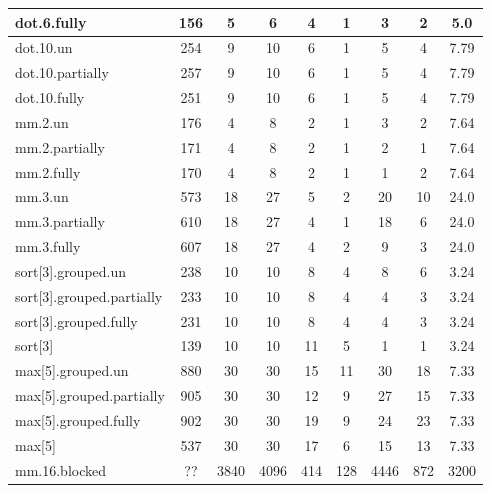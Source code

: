 \begin{table}
\begin{tabular}{lcccccccc}
    dot.6.fully & 156 & 5 & 6 & 4 & 1 & 3 & 2 & 5.0\\
    \midrule
    dot.10.un & 254 & 9 & 10 & 6 & 1 & 5 & 4 & 7.79\\
    dot.10.partially & 257 & 9 & 10 & 6 & 1 & 5 & 4 & 7.79\\
    dot.10.fully & 251 & 9 & 10 & 6 & 1 & 5 & 4 & 7.79\\
    \midrule
    mm.2.un & 176 & 4 & 8 & 2 & 1 & 3 & 2 & 7.64\\
    mm.2.partially & 171 & 4 & 8 & 2 & 1 & 2 & 1 & 7.64\\
    mm.2.fully & 170 & 4 & 8 & 2 & 1 & 1 & 2 & 7.64\\
    \midrule
    mm.3.un & 573 & 18 & 27 & 5 & 2 & 20 & 10 & 24.0\\
    mm.3.partially & 610 & 18 & 27 & 4 & 1 & 18 & 6 & 24.0\\
    mm.3.fully & 607 & 18 & 27 & 4 & 2 & 9 & 3 & 24.0\\
    \midrule
    sort[3].grouped.un & 238 & 10 & 10 & 8 & 4 & 8 & 6 & 3.24\\
    sort[3].grouped.partially & 233 & 10 & 10 & 8 & 4 & 4 & 3 & 3.24\\
    sort[3].grouped.fully & 231 & 10 & 10 & 8 & 4 & 4 & 3 & 3.24\\
    sort[3] & 139 & 10 & 10 & 11 & 5 & 1 & 1 & 3.24\\
    \midrule
    max[5].grouped.un & 880 & 30 & 30 & 15 & 11 & 30 & 18 & 7.33\\
    max[5].grouped.partially & 905 & 30 & 30 & 12 & 9 & 27 & 15 & 7.33\\
    max[5].grouped.fully & 902 & 30 & 30 & 19 & 9 & 24 & 23 & 7.33\\
    max[5] & 537 & 30 & 30 & 17 & 6 & 15 & 13 & 7.33\\
    \midrule
    mm.16.blocked & ?? & 3840 & 4096 & 414 & 128 & 4446 & 872 & 3200\\
    \bottomrule
    \end{tabular}
\end{table}


